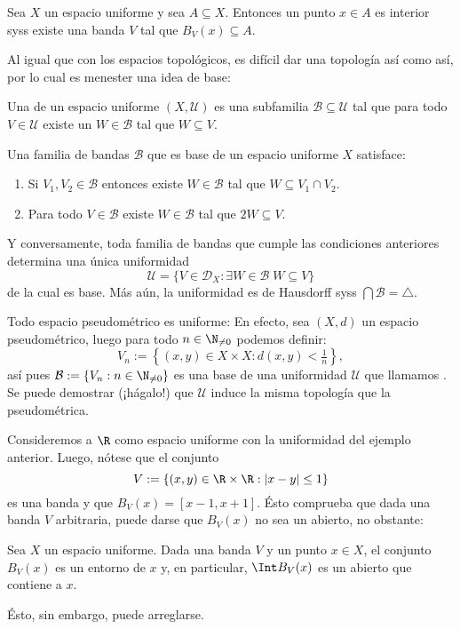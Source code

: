 \documentclass[topologia-analisis.tex]{subfiles}
\begin{document}
\begin{prop}
	Sea $X$ un espacio uniforme y sea $A \subseteq X$.
	Entonces un punto $x \in A$ es interior syss existe una banda $V$ tal que $B_V(x) \subseteq A$.
\end{prop}

Al igual que con los espacios topológicos, es difícil dar una topología así como así, por lo cual es menester una idea de base:
\begin{mydef}
	Una  de un espacio uniforme $(X, \mathcal{U})$ es una subfamilia $\mathcal{B} \subseteq \mathcal{U}$
	tal que para todo $V \in \mathcal{U}$ existe un $W \in \mathcal{B}$ tal que $W \subseteq V$.
\end{mydef}

\begin{prop}
	Una familia de bandas $\mathcal{B}$ que es base de un espacio uniforme $X$ satisface:
	\begin{enumerate}[{BU}1.]
		\item Si $V_1, V_2 \in \mathcal{B}$ entonces existe $W \in \mathcal{B}$ tal que $W \subseteq V_1\cap V_2$.
		\item Para todo $V \in \mathcal{B}$ existe $W \in \mathcal{B}$ tal que $2W \subseteq V$.
	\end{enumerate}
	Y conversamente, toda familia de bandas que cumple las condiciones anteriores determina una única uniformidad
	$$ \mathcal{U} = \{ V \in \mathcal{D}_X : \exists W \in \mathcal{B} \; W \subseteq V \} $$
	de la cual es base.
	Más aún, la uniformidad es de Hausdorff syss $\bigcap \mathcal{B} = \triangle$.
\end{prop}

\begin{ex}
	Todo espacio pseudométrico es uniforme:
	En efecto, sea $(X, d)$ un espacio pseudométrico, luego para todo $n \in \N_{\ne 0}$ podemos definir:
	$$ V_n := \left\{ (x, y) \in X\times X : d(x, y) < \tfrac{1}{n} \right\}, $$
	así pues $\mathcal{B} := \{V_n : n\in \N_{\ne 0}\}$ es una base de una uniformidad $\mathcal{U}$ que llamamos .
	Se puede demostrar (¡hágalo!) que $\mathcal{U}$ induce la misma topología que la pseudométrica.
\end{ex}

Consideremos a $\R$ como espacio uniforme con la uniformidad del ejemplo anterior.
Luego, nótese que el conjunto
$$ V := \{ (x, y) \in \R\times\R : |x - y| \le 1 \} $$
es una banda y que $B_V(x) = [x-1, x+1]$.
Ésto comprueba que dada una banda $V$ arbitraria, puede darse que $B_V(x)$ no sea un abierto, no obstante:
\begin{prop}
	Sea $X$ un espacio uniforme.
	Dada una banda $V$ y un punto $x \in X$, el conjunto $B_V(x)$ es un entorno de $x$ y, en particular, $\Int B_V(x)$ es un abierto que contiene a $x$.
\end{prop}
Ésto, sin embargo, puede arreglarse.
\end{document}
